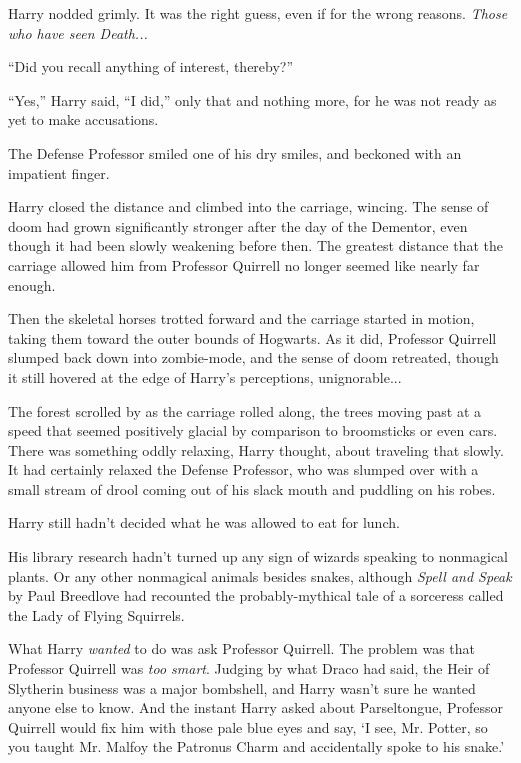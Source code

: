 Harry nodded grimly. It was the right guess, even if for the wrong
reasons. \emph{Those who have seen Death...}

``Did you recall anything of interest, thereby?''

``Yes,'' Harry said, ``I did,'' only that and nothing more, for he was
not ready as yet to make accusations.

The Defense Professor smiled one of his dry smiles, and beckoned with an
impatient finger.

Harry closed the distance and climbed into the carriage, wincing. The
sense of doom had grown significantly stronger after the day of the
Dementor, even though it had been slowly weakening before then. The
greatest distance that the carriage allowed him from Professor Quirrell
no longer seemed like nearly far enough.

Then the skeletal horses trotted forward and the carriage started in
motion, taking them toward the outer bounds of Hogwarts. As it did,
Professor Quirrell slumped back down into zombie-mode, and the sense of
doom retreated, though it still hovered at the edge of Harry's
perceptions, unignorable...

The forest scrolled by as the carriage rolled along, the trees moving
past at a speed that seemed positively glacial by comparison to
broomsticks or even cars. There was something oddly relaxing, Harry
thought, about traveling that slowly. It had certainly relaxed the
Defense Professor, who was slumped over with a small stream of drool
coming out of his slack mouth and puddling on his robes.

Harry still hadn't decided what he was allowed to eat for lunch.

His library research hadn't turned up any sign of wizards speaking to
nonmagical plants. Or any other nonmagical animals besides snakes,
although \emph{Spell and Speak} by Paul Breedlove had recounted the
probably-mythical tale of a sorceress called the Lady of Flying
Squirrels.

What Harry \emph{wanted} to do was ask Professor Quirrell. The problem
was that Professor Quirrell was \emph{too smart}. Judging by what Draco
had said, the Heir of Slytherin business was a major bombshell, and
Harry wasn't sure he wanted anyone else to know. And the instant Harry
asked about Parseltongue, Professor Quirrell would fix him with those
pale blue eyes and say, `I see, Mr. Potter, so you taught Mr. Malfoy the
Patronus Charm and accidentally spoke to his snake.'

